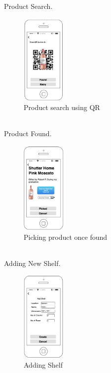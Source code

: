 \pagebreak
Product Search.
\begin{figure}[h!]
                	\centering
                   	\includegraphics[width=0.19\textwidth]{images/search}
                    \caption{Product search using QR}
                \end{figure}
\\Product Found.
\begin{figure}[h!]
                	\centering
                   	\includegraphics[width=0.19\textwidth]{images/pick}
                    \caption{Picking product once found}
                \end{figure}
\pagebreak
\\Adding New Shelf.
\begin{figure}[h!]
                	\centering
                   	\includegraphics[width=0.19\textwidth]{images/shelf}
                    \caption{Adding Shelf}
                \end{figure}
